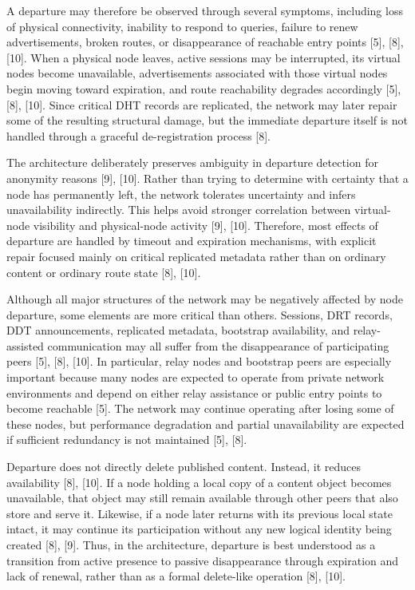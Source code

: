 \documentclass[12pt,a4paper]{article}
\begin{document}
A departure may therefore be observed through several symptoms, including loss of physical connectivity, inability to respond to queries, failure to renew advertisements, broken routes, or disappearance of reachable entry points [5], [8], [10]. When a physical node leaves, active sessions may be interrupted, its virtual nodes become unavailable, advertisements associated with those virtual nodes begin moving toward expiration, and route reachability degrades accordingly [5], [8], [10]. Since critical DHT records are replicated, the network may later repair some of the resulting structural damage, but the immediate departure itself is not handled through a graceful de-registration process [8].

The architecture deliberately preserves ambiguity in departure detection for anonymity reasons [9], [10]. Rather than trying to determine with certainty that a node has permanently left, the network tolerates uncertainty and infers unavailability indirectly. This helps avoid stronger correlation between virtual-node visibility and physical-node activity [9], [10]. Therefore, most effects of departure are handled by timeout and expiration mechanisms, with explicit repair focused mainly on critical replicated metadata rather than on ordinary content or ordinary route state [8], [10].

Although all major structures of the network may be negatively affected by node departure, some elements are more critical than others. Sessions, DRT records, DDT announcements, replicated metadata, bootstrap availability, and relay-assisted communication may all suffer from the disappearance of participating peers [5], [8], [10]. In particular, relay nodes and bootstrap peers are especially important because many nodes are expected to operate from private network environments and depend on either relay assistance or public entry points to become reachable [5]. The network may continue operating after losing some of these nodes, but performance degradation and partial unavailability are expected if sufficient redundancy is not maintained [5], [8].

Departure does not directly delete published content. Instead, it reduces availability [8], [10]. If a node holding a local copy of a content object becomes unavailable, that object may still remain available through other peers that also store and serve it. Likewise, if a node later returns with its previous local state intact, it may continue its participation without any new logical identity being created [8], [9]. Thus, in the architecture, departure is best understood as a transition from active presence to passive disappearance through expiration and lack of renewal, rather than as a formal delete-like operation [8], [10].
\end{document}
